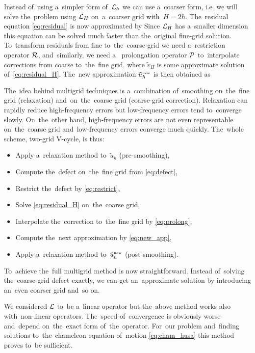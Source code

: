 Instead of~using a~simpler form of~$\mathcal{L}_h$ we can use a~coarser form, i.e. we will solve the~problem using $\mathcal{L}_H$ on~a~coarser grid with~$H=2h$. The~residual equation \eqref{eq:residual} is now approximated by
Since $\mathcal{L}_H$ has a~smaller dimension this equation can be solved much faster than the~original fine-grid solution. To~transform residuals from fine to~the~coarse grid we need a~restriction operator $\mathcal{R}$, and~similarly, we need a~ prolongation operator $\mathcal{P}$ to~interpolate corrections from coarse to~the~fine grid.
where $\tilde v_H$ is some approximate solution of~\eqref{eq:residual_H}. The~new approximation $\tilde u_h^\text{\tiny new}$ is then obtained as

The~idea behind multigrid techniques is a~combination of~smoothing on~the~fine grid (relaxation) and~on~the~coarse grid (coarse-grid correction). Relaxation can rapidly reduce high-frequency errors but low-frequency errors tend to~converge slowly. On~the~other hand, high-frequency errors are not even representable on~the~coarse grid and~low-frequency errors converge much quickly. The~whole scheme, two-grid V-cycle, is thus:
\begin{itemize}
    \item Apply a~relaxation method to~$\tilde u_h$ (pre-smoothing),
    \item Compute the~defect on~the~fine grid from \eqref{eq:defect},
    \item Restrict the~defect by \eqref{eq:restrict},
    \item Solve \eqref{eq:residual_H} on~the~coarse grid,
    \item Interpolate the~correction to~the~fine grid by \eqref{eq:prolong},
    \item Compute the~next approximation by \eqref{eq:new_app},
    \item Apply a~relaxation method to~$\tilde u_h^\text{\tiny new}$ (post-smoothing).
\end{itemize}
To~achieve the~full multigrid method is now straightforward. Instead of~solving the~coarse-grid defect exactly, we can get an~approximate solution \DIFdelbegin {}\DIFdelend by introducing an~even coarser grid and~so on.

We considered $\mathcal{L}$ to~be a~linear operator but the~above method works also with~non-linear operators. The~speed of~convergence is obviously worse and~depend on~the~exact form of~the~operator. For~our problem and~finding solutions to~the~chameleon equation of~motion \eqref{eq:cham_husa} this method proves to~be sufficient.

